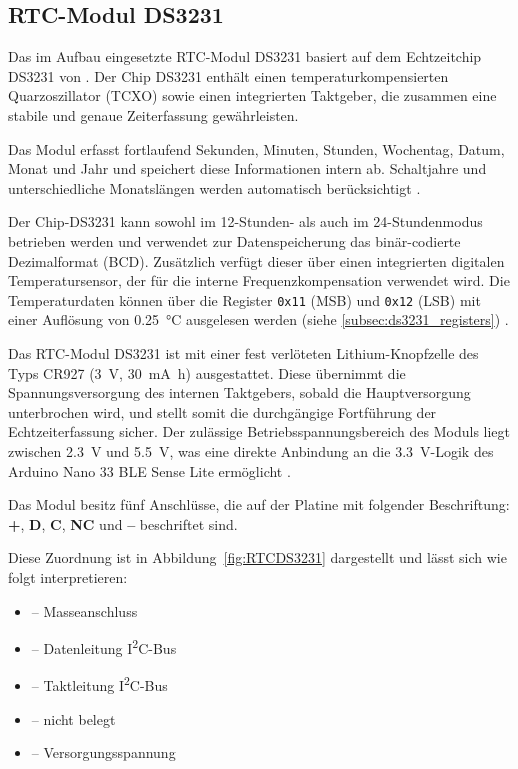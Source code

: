 \subsection{RTC-Modul DS3231}

Das im Aufbau eingesetzte RTC-Modul DS3231 basiert auf dem Echtzeitchip DS3231 von .
Der Chip DS3231 enthält einen temperaturkompensierten Quarzoszillator (TCXO) sowie einen integrierten Taktgeber, 
die zusammen eine stabile und genaue Zeiterfassung gewährleisten.

Das Modul erfasst fortlaufend Sekunden, Minuten, Stunden, Wochentag, Datum, Monat und Jahr 
und speichert diese Informationen intern ab. 
Schaltjahre und unterschiedliche Monatslängen werden automatisch berücksichtigt \cite{MaximIntegrated:2023}.

\medskip
\noindent
Der Chip-DS3231 kann sowohl im 12-Stunden- als auch im 24-Stundenmodus betrieben werden 
und verwendet zur Datenspeicherung das binär-codierte Dezimalformat (BCD).  
Zusätzlich verfügt dieser über einen integrierten digitalen Temperatursensor, 
der für die interne Frequenzkompensation verwendet wird.  
Die Temperaturdaten können über die Register \texttt{0x11} (MSB) und \texttt{0x12} (LSB) mit einer Auflösung von \SI{0,25}{\celsius} ausgelesen werden (siehe \ref{subsec:ds3231_registers}) \cite{MaximIntegrated:2023}. 


\medskip
\noindent

Das RTC-Modul DS3231 ist mit einer fest verlöteten Lithium-Knopfzelle des Typs CR927 (\SI{3}{V}, \SI{30}{\milli\ampere\hour}) ausgestattet. 
Diese übernimmt die Spannungsversorgung des internen Taktgebers, sobald die Hauptversorgung unterbrochen wird, 
und stellt somit die durchgängige Fortführung der Echtzeiterfassung sicher. 
Der zulässige Betriebsspannungsbereich des Moduls liegt zwischen \SI{2,3}{V} und \SI{5,5}{V}, 
was eine direkte Anbindung an die \SI{3,3}{V}-Logik des Arduino Nano 33 BLE Sense Lite ermöglicht \cite{MaximIntegrated:2023}.


\medskip
\noindent
Das Modul besitz fünf Anschlüsse, die auf der Platine mit folgender Beschriftung:  
\textbf{+}, \textbf{D}, \textbf{C}, \textbf{NC} und \textbf{--} beschriftet sind. 

Diese Zuordnung ist in Abbildung~\ref{fig:RTCDS3231} dargestellt und lässt sich wie folgt interpretieren:
\begin{itemize}
	\item {} – Masseanschluss
	\item {} – Datenleitung I\textsuperscript{2}C-Bus
	\item {} – Taktleitung I\textsuperscript{2}C-Bus
	\item {} – nicht belegt
	\item {} – Versorgungsspannung 
\end{itemize}




